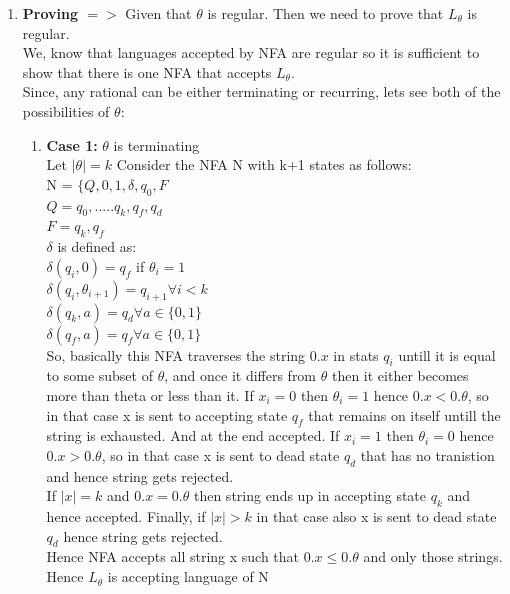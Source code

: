 \documentclass{article}
\begin{document}
\begin{enumerate}
    \item \textbf{Proving $=>$}
        Given that $\theta $ is regular. Then we need to prove that $L_{\theta}$ is regular.\\
        We, know that languages accepted by NFA are regular so it is sufficient to show that there is one NFA that accepts $L_{\theta}$.\\
        Since, any rational can be either terminating or recurring, lets see both of the possibilities of  $\theta $:
        \begin{enumerate}
            \item \textbf{Case 1: } $\theta $ is terminating\\
            
            Let $|\theta| = k$
            Consider the NFA N with k+1 states as follows: \\
            N = $\{Q,{0,1},\delta,q_0,F $\\
            $Q = {q_0,.....q_k,q_f,q_d}$\\
            $F = {q_k,q_f}$\\   
            $\delta$ is defined as:\\
            $\delta(q_i,0) = q_f $ if $\theta_i = 1$\\
            $\delta(q_i,\theta_{i+1}) = q_{i+1} \forall i < k$\\
            $\delta(q_k,a) = q_d \forall a \in \{0,1\}$\\
            $\delta(q_f,a) = q_f \forall a \in \{0,1\}$\\

            So, basically this NFA traverses the string $0.x$ in stats $q_i$ untill it is equal to some subset of $\theta$, and once it differs from $\theta$ then it either
            becomes more than theta or less than it. If $x_i = 0$ then $\theta_i = 1$ hence $0.x < 0.\theta$, so in that case x is sent to accepting state $q_f$ that remains on itself untill the string is exhausted.
            And at the end accepted. If $x_i = 1$ then $\theta_i = 0$ hence $0.x > 0.\theta$, so in that case x is sent to dead state $q_d$ that has no tranistion and hence string gets rejected. \\
            If $|x| = k$ and $0.x = 0.\theta$ then string ends up in accepting state $q_k$ and hence accepted.
            Finally, if $|x| > k$ in that case also x is sent to dead state $q_d$ hence string gets rejected. \\
            Hence NFA accepts all string x such that $0.x \leq 0.\theta$ and only those strings.\\
            Hence $L_{\theta}$ is accepting language of N\\



\end{enumerate}
\end{enumerate}
\end{document}
